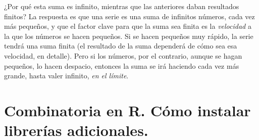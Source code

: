 \documentclass[10pt,a4paper]{article}\usepackage[]{graphicx}\usepackage[]{color}
\newcounter {cont01}
\begin{document}
      ¿Por qué esta suma es infinito, mientras que las anteriores daban resultados finitos? La respuesta es que una serie es una suma de infinitos números,
      cada vez más pequeños, y que el factor clave para que la suma sea finita es la {\em velocidad} a la que los números se hacen pequeños. Si se hacen
      pequeños muy rápido,  la serie tendrá una suma finita (el resultado de la suma dependerá de cómo sea esa velocidad, en detalle). Pero si los números,
      por el contrario, aunque se hagan pequeños, lo hacen despacio, entonces la suma se irá haciendo cada vez más grande, hasta valer infinito, {\em en el límite}.
      
      
      \section{Combinatoria en R. Cómo instalar librerías adicionales.}
      \label{tut03:sec:CombinatoriaR}
      
\end{document}
